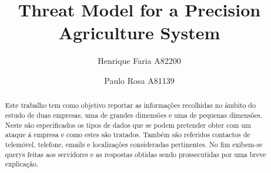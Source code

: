 

\title{Threat Model for a Precision Agriculture System}

\author{Henrique Faria A82200 \and Paulo Rosa A81139}




\maketitle

\begin{abstract}
Este trabalho tem como objetivo reportar as informações recolhidas no âmbito do estudo de duas empresas, uma de grandes dimensões e uma de pequenas dimensões.\newline
Neste são especificados os tipos de dados que se podem pretender obter com um ataque á empresa e como estes são tratados. Também são referidos contactos de telemóvel, telefone, emails e localizações consideradas pertinentes. No fim exibem-se querys feitas aos servidores e as respostas obtidas sendo prossecutidas por uma breve explicação. 

\end{abstract}
\newpage
